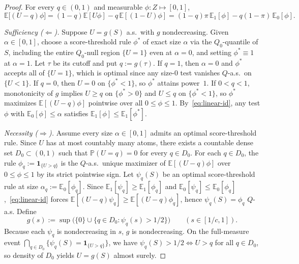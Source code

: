 \documentclass[11pt]{article}
\theoremstyle{plain}
\theoremstyle{definition}
\theoremstyle{remark}
\begin{document}
\begin{proof}
For every $q \in (0, 1)$ and measurable $\phi : Z \mapsto [0, 1]$,
\begin{equation}\label{eq:linear-id}
\mathbb{E}\bigl[(U - q)\phi\bigr]
= (1 - q)\mathbb{E}[U\phi] - q\,\mathbb{E}[(1 - U)\phi]
= (1 - q)\pi\,\mathbb{E}_1[\phi] - q(1 - \pi)\,\mathbb{E}_0[\phi].
\end{equation}

\emph{Sufficiency ($\Leftarrow$).} Suppose $U = g(S)$ a.s.\ with $g$ nondecreasing. Given $\alpha \in [0, 1]$, choose a score-threshold rule $\phi^*$ of exact size $\alpha$ via the $Q_0$-quantile of $S$, including the entire $Q_0$-null region $\{U = 1\}$ even at $\alpha = 0$, and setting $\phi^* \equiv 1$ at $\alpha = 1$. Let $\tau$ be its cutoff and put $q := g(\tau)$. If $q = 1$, then $\alpha = 0$ and $\phi^*$ accepts all of $\{U = 1\}$, which is optimal since any size-$0$ test vanishes $Q$-a.s.\ on $\{U < 1\}$. If $q = 0$, then $U = 0$ on $\{\phi^* < 1\}$, so $\phi^*$ attains power~$1$. If $0 < q < 1$, monotonicity of $g$ implies $U \ge q$ on $\{\phi^* > 0\}$ and $U \le q$ on $\{\phi^* < 1\}$, so $\phi^*$ maximizes $\mathbb{E}[(U - q)\phi]$ pointwise over all $0 \le \phi \le 1$. By~\eqref{eq:linear-id}, any test $\phi$ with $\mathbb{E}_0[\phi] \le \alpha$ satisfies $\mathbb{E}_1[\phi] \le \mathbb{E}_1[\phi^*]$.

\emph{Necessity ($\Rightarrow$).} Assume every size $\alpha \in [0, 1]$ admits an optimal score-threshold rule. Since $U$ has at most countably many atoms, there exists a countable dense set $D_0 \subset (0, 1)$ such that $\mathbb{P}(U = q) = 0$ for every $q \in D_0$. For each $q \in D_0$, the rule $\phi_q := \mathbf{1}_{\{U > q\}}$ is the $Q$-a.s.\ unique maximizer of $\mathbb{E}[(U - q)\phi]$ over $0 \le \phi \le 1$ by its strict pointwise sign. Let $\psi_q(S)$ be an optimal score-threshold rule at size $\alpha_q := \mathbb{E}_0[\phi_q]$. Since $\mathbb{E}_1[\psi_q] \ge \mathbb{E}_1[\phi_q]$ and $\mathbb{E}_0[\psi_q] \le \mathbb{E}_0[\phi_q]$,~\eqref{eq:linear-id} forces $\mathbb{E}[(U - q)\psi_q] \ge \mathbb{E}[(U - q)\phi_q]$, hence $\psi_q(S) = \phi_q$ $Q$-a.s. Define
\[
g(s) := \sup\bigl(\{0\} \cup \{q \in D_0 : \psi_q(s) > 1/2\}\bigr) \qquad (s \in [1/c, 1]).
\]
Because each $\psi_q$ is nondecreasing in $s$, $g$ is nondecreasing. On the full-measure event $\bigcap_{q \in D_0} \{\psi_q(S) = \mathbf{1}_{\{U > q\}}\}$, we have $\psi_q(S) > 1/2 \iff U > q$ for all $q \in D_0$, so density of $D_0$ yields $U = g(S)$ almost surely.
\end{proof}
\end{document}
